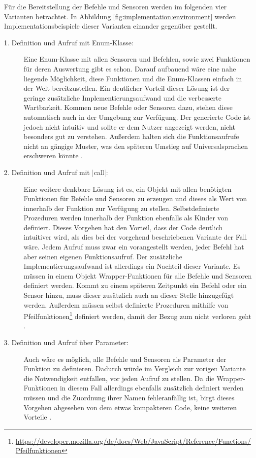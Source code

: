 Für die Bereitstellung der Befehle und Sensoren werden im folgenden vier Varianten betrachtet. In Abbildung \ref{fig:implementation:environment} werden Implementationsbeispiele dieser Varianten einander gegenüber gestellt.

\begin{description}
  \item[1. Definition und Aufruf mit Enum-Klasse:] Eine Enum-Klasse mit allen Sensoren und Befehlen, sowie zwei Funktionen für deren Auswertung gibt es schon. Darauf aufbauend wäre eine nahe liegende Möglichkeit, diese Funktionen und die Enum-Klassen einfach in der Welt bereitzustellen. Ein deutlicher Vorteil dieser Lösung ist der geringe zusätzliche Implementierungsaufwand und die verbesserte Wartbarkeit. Kommen neue Befehle oder Sensoren dazu, stehen diese automatisch auch in der Umgebung zur Verfügung. Der generierte Code ist jedoch nicht intuitiv und sollte er dem Nutzer angezeigt werden, nicht besonders gut zu verstehen. Außerdem halten sich die Funktionsaufrufe nicht an gängige Muster, was den späteren Umstieg auf Universalsprachen erschweren könnte .
  \item[2. Definition und Aufruf mit \inlinec|call|:] Eine weitere denkbare Lösung ist es, ein Objekt mit allen benötigten Funktionen für Befehle und Sensoren zu erzeugen und dieses als Wert von  innerhalb der Funktion zur Verfügung zu stellen. Selbstdefinierte Prozeduren werden innerhalb der Funktion ebenfalls als Kinder von  definiert. Dieses Vorgehen hat den Vorteil, dass der Code deutlich intuitiver wird, als dies bei der vorgehend beschriebenen Variante der Fall wäre. Jedem Aufruf muss zwar ein  vorangestellt werden, jeder Befehl hat aber seinen eigenen Funktionsaufruf. Der zusätzliche Implementierungsaufwand ist allerdings ein Nachteil dieser Variante. Es müssen in einem Objekt Wrapper-Funktionen für alle Befehle und Sensoren definiert werden. Kommt zu einem späteren Zeitpunkt ein Befehl oder ein Sensor hinzu, muss dieser zusätzlich auch an dieser Stelle hinzugefügt werden. Außerdem müssen selbst definierte Prozeduren mithilfe von Pfeilfunktionen\footnote{\url{https://developer.mozilla.org/de/docs/Web/JavaScript/Reference/Functions/Pfeilfunktionen}} definiert werden, damit der Bezug zum  nicht verloren geht .
  \item[3. Definition und Aufruf über Parameter:] Auch wäre es möglich, alle Befehle und Sensoren als Parameter der Funktion zu definieren. Dadurch würde im Vergleich zur vorigen Variante die Notwendigkeit entfallen,  vor jeden Aufruf zu stellen. Da die Wrapper-Funktionen in diesem Fall allerdings ebenfalls zusätzlich definiert werden müssen und die Zuordnung ihrer Namen fehleranfällig ist, birgt dieses Vorgehen abgesehen von dem etwas kompakteren Code, keine weiteren Vorteile .

\end{description}
